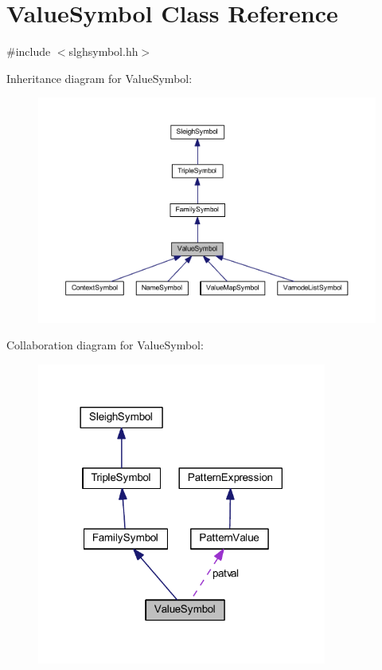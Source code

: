 \hypertarget{class_value_symbol}{}\section{Value\+Symbol Class Reference}
\label{class_value_symbol}


{\ttfamily \#include $<$slghsymbol.\+hh$>$}



Inheritance diagram for Value\+Symbol\+:
\nopagebreak
\begin{figure}[H]
\begin{center}
\leavevmode
\includegraphics[width=350pt]{class_value_symbol__inherit__graph}
\end{center}
\end{figure}


Collaboration diagram for Value\+Symbol\+:
\nopagebreak
\begin{figure}[H]
\begin{center}
\leavevmode
\includegraphics[width=270pt]{class_value_symbol__coll__graph}
\end{center}
\end{figure}
